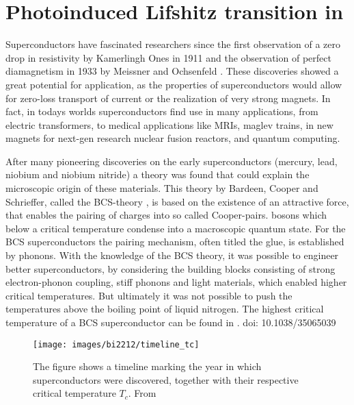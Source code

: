 \chapter{Photoinduced Lifshitz transition in }
\label{ch:bi2212}

Superconductors have fascinated researchers since the first observation of a zero drop in resistivity by Kamerlingh Ones in 1911 \cite{van_delft_discovery_2010} and the observation of perfect diamagnetism in 1933 by Meissner and Ochsenfeld \cite{meissner_neuer_1933}.
These discoveries showed a great potential for application, as the properties of superconductors would allow for zero-loss transport of current or the realization of very strong magnets.
In fact, in todays worlds superconductors find use in many applications, from electric transformers, to medical applications like MRIs, maglev trains, in new magnets for next-gen research nuclear fusion reactors, and quantum computing.

After many pioneering discoveries on the early superconductors (mercury, lead, niobium and niobium nitride) a theory was found that could explain the microscopic origin of these materials.
This theory by Bardeen, Cooper and Schrieffer, called the BCS-theory \cite{bardeen_theory_1957}, is based on the existence of an attractive force, that enables the pairing of charges into so called Cooper-pairs. bosons which below a critical temperature condense into a macroscopic quantum state.
For the BCS superconductors the pairing mechanism, often titled the glue, is established by phonons.
With the knowledge of the BCS theory, it was possible to engineer better superconductors, by considering the building blocks consisting of strong electron-phonon coupling, stiff phonons and light materials, which enabled higher critical temperatures.
But ultimately it was not possible to push the temperatures above the boiling point of liquid nitrogen.
The highest critical temperature of a BCS superconductor can be found in  \cite{}. doi: 10.1038/35065039

\begin{figure}
	\centering
	\texttt{[image: images/bi2212/timeline\_tc]}
	\caption{The figure shows a timeline marking the year in which superconductors were discovered, together with their respective critical temperature $T_c$. From \cite{pjray_english_2015}}
	\label{fig:timeline}
\end{figure}

